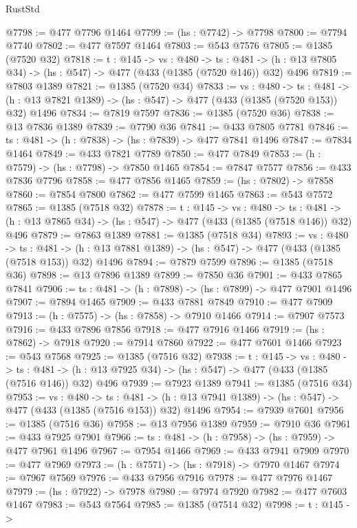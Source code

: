 \begin{lexlean}{RustStd}
\begin{coremodule}
@7798 := @477 @7796 @1464
@7799 := (hs : @7742) -> @7798
@7800 := @7794 @7740
@7802 := @477 @7597 @1464
@7803 := @543 @7576
@7805 := @1385 (@7520 @32)
@7818 := {t : @145} ->
  {vs : @480} ->
  {ts : @481} -> (h : @13 @7805 @34) -> (hs : @547) -> @477 (@433 (@1385 (@7520 @146)) @32) @496
@7819 := @7803 @1389
@7821 := @1385 (@7520 @34)
@7833 := {vs : @480} ->
  {ts : @481} -> (h : @13 @7821 @1389) -> (hs : @547) -> @477 (@433 (@1385 (@7520 @153)) @32) @1496
@7834 := @7819 @7597
@7836 := @1385 (@7520 @36)
@7838 := @13 @7836 @1389
@7839 := @7790 @36
@7841 := @433 @7805 @7781
@7846 := {ts : @481} -> (h : @7838) -> (hs : @7839) -> @477 @7841 @1496
@7847 := @7834 @1464
@7849 := @433 @7821 @7789
@7850 := @477 @7849
@7853 := (h : @7579) -> (hs : @7798) -> @7850 @1465
@7854 := @7847 @7577
@7856 := @433 @7836 @7796
@7858 := @477 @7856 @1465
@7859 := (hs : @7802) -> @7858
@7860 := @7854 @7800
@7862 := @477 @7599 @1465
@7863 := @543 @7572
@7865 := @1385 (@7518 @32)
@7878 := {t : @145} ->
  {vs : @480} ->
  {ts : @481} -> (h : @13 @7865 @34) -> (hs : @547) -> @477 (@433 (@1385 (@7518 @146)) @32) @496
@7879 := @7863 @1389
@7881 := @1385 (@7518 @34)
@7893 := {vs : @480} ->
  {ts : @481} -> (h : @13 @7881 @1389) -> (hs : @547) -> @477 (@433 (@1385 (@7518 @153)) @32) @1496
@7894 := @7879 @7599
@7896 := @1385 (@7518 @36)
@7898 := @13 @7896 @1389
@7899 := @7850 @36
@7901 := @433 @7865 @7841
@7906 := {ts : @481} -> (h : @7898) -> (hs : @7899) -> @477 @7901 @1496
@7907 := @7894 @1465
@7909 := @433 @7881 @7849
@7910 := @477 @7909
@7913 := (h : @7575) -> (hs : @7858) -> @7910 @1466
@7914 := @7907 @7573
@7916 := @433 @7896 @7856
@7918 := @477 @7916 @1466
@7919 := (hs : @7862) -> @7918
@7920 := @7914 @7860
@7922 := @477 @7601 @1466
@7923 := @543 @7568
@7925 := @1385 (@7516 @32)
@7938 := {t : @145} ->
  {vs : @480} ->
  {ts : @481} -> (h : @13 @7925 @34) -> (hs : @547) -> @477 (@433 (@1385 (@7516 @146)) @32) @496
@7939 := @7923 @1389
@7941 := @1385 (@7516 @34)
@7953 := {vs : @480} ->
  {ts : @481} -> (h : @13 @7941 @1389) -> (hs : @547) -> @477 (@433 (@1385 (@7516 @153)) @32) @1496
@7954 := @7939 @7601
@7956 := @1385 (@7516 @36)
@7958 := @13 @7956 @1389
@7959 := @7910 @36
@7961 := @433 @7925 @7901
@7966 := {ts : @481} -> (h : @7958) -> (hs : @7959) -> @477 @7961 @1496
@7967 := @7954 @1466
@7969 := @433 @7941 @7909
@7970 := @477 @7969
@7973 := (h : @7571) -> (hs : @7918) -> @7970 @1467
@7974 := @7967 @7569
@7976 := @433 @7956 @7916
@7978 := @477 @7976 @1467
@7979 := (hs : @7922) -> @7978
@7980 := @7974 @7920
@7982 := @477 @7603 @1467
@7983 := @543 @7564
@7985 := @1385 (@7514 @32)
@7998 := {t : @145} ->

\end{coremodule}
\end{lexlean}
